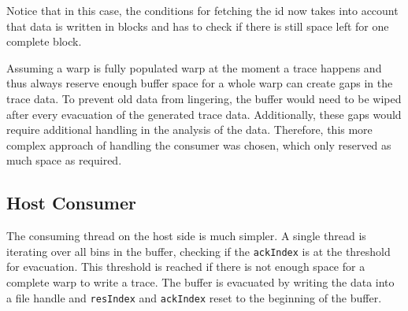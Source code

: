 	Notice that in this case, the conditions for fetching the id now takes into account that data is written in blocks and has to check if there is still space left for one complete block. 
	
	Assuming a warp is fully populated warp at the moment a trace happens and thus always reserve enough buffer space for a whole warp can create gaps in the trace data. To prevent old data from lingering, the buffer would need to be wiped after every evacuation of the
	generated trace data. Additionally, these gaps would require additional handling in the analysis of the data.
	Therefore, this more complex approach of handling the consumer was chosen, which only reserved as much space as required.

	
	\subsection{Host Consumer}
	The consuming thread on the host side is much simpler. A single thread is iterating over all bins in the buffer, checking if the
	\verb|ackIndex| is at the threshold for evacuation. This threshold is reached if there is not enough space for a complete warp to
	write a trace.
	The buffer is evacuated by writing the data into a file handle and \verb|resIndex| and \verb|ackIndex| reset to the beginning of the buffer.
%	
%
%

